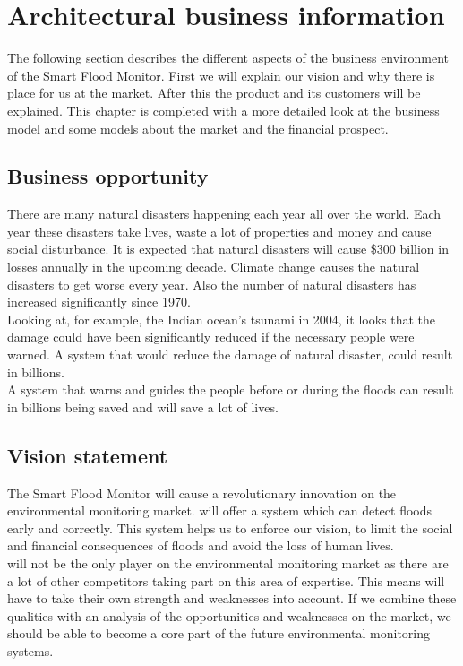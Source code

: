 \chapter{Architectural business information}
\label{ch:business}
The following section describes the different aspects of the business environment of the Smart Flood Monitor. First we will explain our vision and why there is place for us at the market. After this the product and its customers will be explained. This chapter is completed with a more detailed look at the business model and some models about the market and the financial prospect.

\section{Business opportunity}
There are many natural disasters happening each year all over the world. Each year these disasters take lives, waste a lot of properties and money and cause social disturbance. It is expected that natural disasters will cause \$300 billion in losses annually in the upcoming decade. Climate change causes the natural disasters to get worse every year. Also the number of natural disasters has increased significantly since 1970.\\
Looking at, for example, the Indian ocean's tsunami in 2004, it looks that the damage could have been significantly reduced if the necessary people were warned. A system that would reduce the damage of natural disaster, could result in billions. \\
A system that warns and guides the people before or during the floods can result in billions being saved and will save a lot of lives.

\section{Vision statement}
The Smart Flood Monitor will cause a revolutionary innovation on the environmental monitoring market. \CompanyName{} will offer a system which can detect floods early and correctly. This system helps us to enforce our vision, to limit the social and financial consequences of floods and avoid the loss of human lives. \\

\CompanyName{} will not be the only player on the environmental monitoring market as there are a lot of other competitors taking part on this area of expertise. This means \CompanyName{} will have to take their own strength and weaknesses into account. If we combine these qualities with an analysis of the opportunities and weaknesses on the market, we should be able to become a core part of the future environmental monitoring systems.\\

